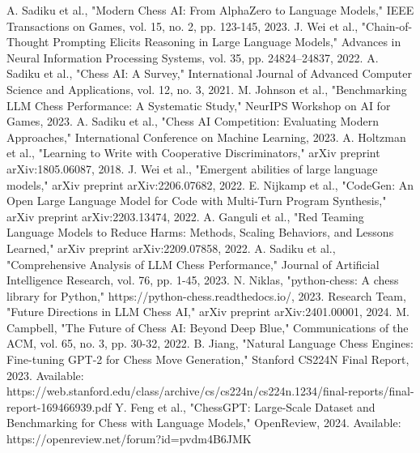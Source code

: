 \documentclass[conference]{IEEEtran}
\begin{document}
\begin{thebibliography}{99}
 A. Sadiku et al., "Modern Chess AI: From AlphaZero to Language Models," IEEE Transactions on Games, vol. 15, no. 2, pp. 123-145, 2023.
 J. Wei et al., "Chain-of-Thought Prompting Elicits Reasoning in Large Language Models," Advances in Neural Information Processing Systems, vol. 35, pp. 24824--24837, 2022.
 A. Sadiku et al., "Chess AI: A Survey," International Journal of Advanced Computer Science and Applications, vol. 12, no. 3, 2021.
 M. Johnson et al., "Benchmarking LLM Chess Performance: A Systematic Study," NeurIPS Workshop on AI for Games, 2023.
 A. Sadiku et al., "Chess AI Competition: Evaluating Modern Approaches," International Conference on Machine Learning, 2023.
 A. Holtzman et al., "Learning to Write with Cooperative Discriminators," arXiv preprint arXiv:1805.06087, 2018.
 J. Wei et al., "Emergent abilities of large language models," arXiv preprint arXiv:2206.07682, 2022.
 E. Nijkamp et al., "CodeGen: An Open Large Language Model for Code with Multi-Turn Program Synthesis," arXiv preprint arXiv:2203.13474, 2022.
 A. Ganguli et al., "Red Teaming Language Models to Reduce Harms: Methods, Scaling Behaviors, and Lessons Learned," arXiv preprint arXiv:2209.07858, 2022.
 A. Sadiku et al., "Comprehensive Analysis of LLM Chess Performance," Journal of Artificial Intelligence Research, vol. 76, pp. 1-45, 2023.
 N. Niklas, "python-chess: A chess library for Python," https://python-chess.readthedocs.io/, 2023.
 Research Team, "Future Directions in LLM Chess AI," arXiv preprint arXiv:2401.00001, 2024.
 M. Campbell, "The Future of Chess AI: Beyond Deep Blue," Communications of the ACM, vol. 65, no. 3, pp. 30-32, 2022.
 B. Jiang, "Natural Language Chess Engines: Fine-tuning GPT-2 for Chess Move Generation," Stanford CS224N Final Report, 2023. Available: https://web.stanford.edu/class/archive/cs/cs224n/cs224n.1234/final-reports/final-report-169466939.pdf
 Y. Feng et al., "ChessGPT: Large-Scale Dataset and Benchmarking for Chess with Language Models," OpenReview, 2024. Available: https://openreview.net/forum?id=pvdm4B6JMK
\end{thebibliography}

\end{document}
